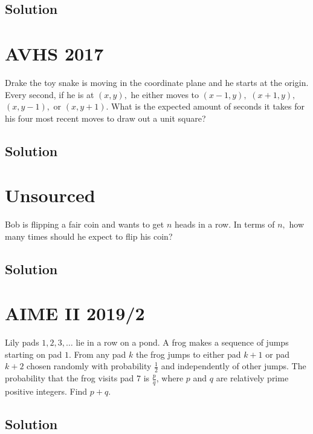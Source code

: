 \documentclass{article}
\begin{document}
\subsection{Solution}    





\pagebreak\section{AVHS 2017} Drake the toy snake is moving in the coordinate plane and he starts at the origin. Every second, if he is at $(x,y),$ he either moves to $(x-1,y),$ $(x+1,y),$ $(x,y-1),$ or $(x,y+1).$ What is the expected amount of seconds it takes for his four most recent moves to draw out a unit square?
\subsection{Solution}




\pagebreak\section{Unsourced}
Bob is flipping a fair coin and wants to get $n$ heads in a row. In terms of $n,$ how many times should he expect to flip his coin?
\subsection{Solution}





\pagebreak\section{AIME II 2019/2} Lily pads $1,2,3,\ldots$ lie in a row on a pond. A frog makes a sequence of jumps starting on pad $1$. From any pad $k$ the frog jumps to either pad $k+1$ or pad $k+2$ chosen randomly with probability $\tfrac{1}{2}$ and independently of other jumps. The probability that the frog visits pad $7$ is $\tfrac{p}{q}$, where $p$ and $q$ are relatively prime positive integers. Find $p+q$.
\subsection{Solution}
\end{document}
